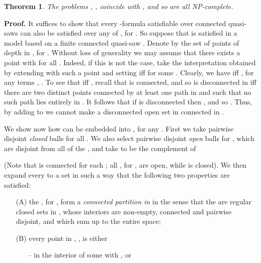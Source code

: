 \documentclass{article}
\newtheorem{theorem}{Theorem}
\newcommand{\NP}{\textsc{NP}}
\newcommand{\qedsymbol}{\ding{113}}
\newenvironment{proof}{\par\noindent\textbf{Proof.}}{\mbox{}\hfill\qedsymbol\par\bigskip}
\begin{document}
\begin{theorem}
The problems , , coincide with , and so are all \NP-complete.
\end{theorem}
\begin{proof}
It suffices to show that every -formula  satisfiable over connected quasi-saws can also be satisfied over any of , for .
So suppose that  is satisfied in a model  based on a finite connected quasi-saw . Denote by  the set of points of depth  in , for .
Without loss of generality we may assume that there exists a point  with  for all . Indeed, if this is not the case, take the interpretation  obtained by extending  with such a point  and setting  iff  for some . Clearly, we have  iff , for any terms , . To see that  iff , recall that  is connected, and so  is disconnected in  iff there are two distinct points  connected by at least one path in  and such that no such path lies entirely in . It follows that if  is disconnected then , and so .  Thus, by adding  to  we cannot make a disconnected open set in  connected in .

We show now how  can be embedded into , for any .
First we take pairwise disjoint \emph{closed} balls  for all . We also select pairwise disjoint \emph{open} balls  for
, which are disjoint from all of the , and take  to be the complement of

(Note that  is connected for each ; all , for , are open, while  is closed).
We then expand every  to a set  in such a way that the following two properties are satisfied:
\begin{itemize}
\item[(A)] the , for , form a \emph{connected partition in } in the sense that  the  are regular closed sets in , whose interiors are non-empty, connected and  pairwise disjoint, and which sum up to the entire space;

\item[(B)] every point in , , is either

\begin{itemize}
\item[--]
in the interior of some  with , or


\end{itemize}
\end{itemize}
\end{proof}
\end{document}
